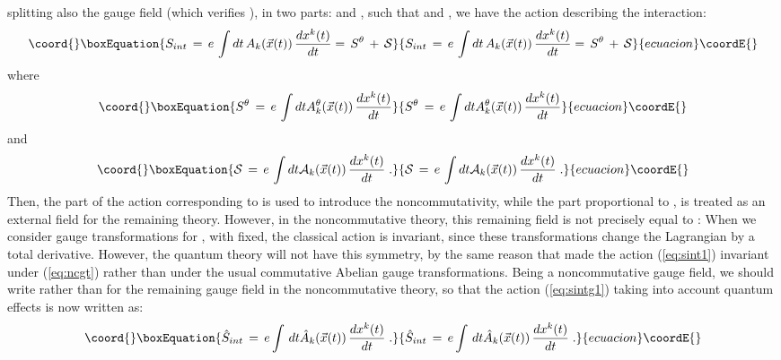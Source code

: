 \documentclass[a4paper,12pt]{article}
\begin{document}
splitting also the gauge field \coordHE{} (which verifies
\coordHE{}), in two parts: \coordHE{} and \coordHE{}, such that
\coordHE{} and \coordHE{}, we have the action describing the interaction:
\begin{equation}\coord{}\boxEquation{
  \label{eq:sintg1}
S_{int} \,=\, e\, \int dt \,A_k({\vec x}(t))\, \frac{dx^k(t)}{dt} 
=\,S^\theta \,+\, {\mathcal S} 
}{
  S_{int} \,=\, e\, \int dt \,A_k({\vec x}(t))\, \frac{dx^k(t)}{dt} 
=\,S^\theta \,+\, {\mathcal S} 
}{ecuacion}\coordE{}\end{equation}
where
\begin{equation}\coord{}\boxEquation{
S^\theta \,=\,e \, \int dt A^\theta_k({\vec x}(t))\,
\frac{dx^k(t)}{dt} 
}{
S^\theta \,=\,e \, \int dt A^\theta_k({\vec x}(t))\,
\frac{dx^k(t)}{dt} 
}{ecuacion}\coordE{}\end{equation} 
and
\begin{equation}\coord{}\boxEquation{
{\mathcal S} \,=\, e \, \int dt{\mathcal A}_k({\vec x}(t))\, 
\frac{dx^k(t)}{dt}\;.  
}{
{\mathcal S} \,=\, e \, \int dt{\mathcal A}_k({\vec x}(t))\, 
\frac{dx^k(t)}{dt}\;.  
}{ecuacion}\coordE{}\end{equation}
Then, the part of the action corresponding to \coordHE{} is used to
introduce the noncommutativity, while the part proportional to
\coordHE{}, is treated as an external field for the remaining
theory.  However, in the noncommutative theory, this remaining
field
is not precisely equal to \coordHE{}: When we consider gauge
transformations for \coordHE{}, with \coordHE{} fixed, the
classical
action is invariant, since these transformations change the
Lagrangian
by a total derivative. However, the quantum theory will not have
this
symmetry, by the same reason that made the action (\ref{eq:sint1})
invariant under (\ref{eq:ncgt}) rather than under the usual
commutative Abelian gauge transformations. Being a noncommutative
gauge field, we should write \coordHE{} rather than
\coordHE{} for the remaining gauge field in the noncommutative
theory, so that the action (\ref{eq:sintg1}) taking into account
quantum effects is now written as:
\begin{equation}\coord{}\boxEquation{
  \label{eq:sintg2}
{\hat S}_{int} \,=\,e \int \, dt {\hat A}_k({\vec x}(t))\,
\frac{dx^k(t)}{dt} 
\;.
}{
  {\hat S}_{int} \,=\,e \int \, dt {\hat A}_k({\vec x}(t))\,
\frac{dx^k(t)}{dt} 
\;.
}{ecuacion}\coordE{}\end{equation}
\end{document}
